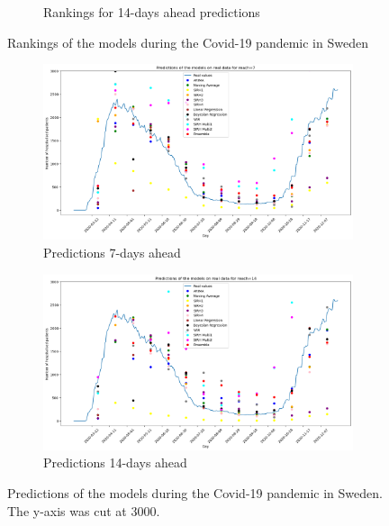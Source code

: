 \begin{figure}[h!]
\begin{subfigure}[b]{0.45\textwidth}
      \caption{Rankings for 14-days ahead predictions}
      \label{fig:sousfig2}
    \end{subfigure}
    \caption{Rankings of the models during the Covid-19 pandemic in Sweden}
    \label{fig:rankings_real_data}
\end{figure}


\begin{figure}[h!]
    \centering
    \begin{subfigure}[b]{0.5\textwidth}
      \centering
      \includegraphics[width=\textwidth]{figures/real_data_7.png}  %
      \caption{Predictions 7-days ahead}
      \label{fig:sousfig1g}
    \end{subfigure}
    \hfill
    \begin{subfigure}[b]{0.5\textwidth}
      \centering
      \includegraphics[width=\textwidth]{figures/real_data_14.png}  %
      \caption{Predictions 14-days ahead}
      \label{fig:sousfig2g}
    \end{subfigure}
    \caption{Predictions of the models during the Covid-19 pandemic in Sweden. The y-axis was cut at 3000.}
    \label{fig:real_data}
\end{figure}

